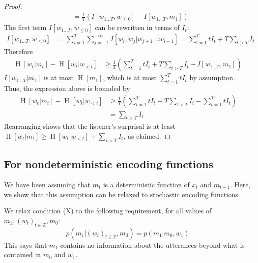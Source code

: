 \documentclass[11pt,letterpaper]{article}
\begin{document}
\begin{proof}
\begin{align}
& = \frac{1}{T} \left(I[w_{1\dots T}, w_{\leq 0}] - I[w_{1\dots T}, m_1]\right) 
\end{align}
The first term $I[w_{1\dots T}, w_{\leq 0}]$ can be rewritten in terms of $I_t$:
\begin{align}\label{eq:i-expanded}
I[w_{1\dots T}, w_{\leq 0}] &= \sum_{i=1}^T \sum_{j=-1}^{-\infty} I[w_i, w_j | w_{j+1}...w_{i-1}] = \sum_{t=1}^T t I_t + T \sum_{t > T} I_t
\end{align}
Therefore
\begin{align*}
\operatorname{H}[w_t | m_t] - \operatorname{H}[w_t | w_{<t}]& \geq \frac{1}{T} \left(\sum_{t=1}^T t I_t + T \sum_{t > T} I_t - I[w_{1\dots T}, m_1]\right) 
\end{align*}
$I[w_{1\dots T}|m_1]$ is at most $\operatorname{H}[m_1]$, which is at most $\sum_{t=1}^T t I_t$ by assumption. Thus, the expression above is bounded by
\begin{align*}
\operatorname{H}[w_t | m_t] - \operatorname{H}[w_t | w_{<t}]& \geq \frac{1}{T} \left(\sum_{t=1}^T t I_t + T \sum_{t > T} I_t - \sum_{t=1}^T t I_t\right) \\
&= \sum_{t > T} I_t
\end{align*}
Rearranging shows that the listener's surprisal is at least $\operatorname{H}[w_t|m_t] \geq \operatorname{H}[w_t | w_{<t}] + \sum_{t > T} I_t$, as claimed.
\end{proof}





\subsection{For nondeterministic encoding functions}

We have been assuming that $m_t$ is a deterministic function of $x_t$ and $m_{t-1}$.
Here, we show that this assumption can be relaxed to stochastic encoding functions.

We relax condition (X) to the following requirement, for all values of $m_1, (w_{t})_{t \in \mathbb{Z}}, m_0$:
\begin{equation}\label{eq:listener-markov-nondeterministic}
p(m_1| (w_{t})_{t \in \mathbb{Z}}, m_0)   = p(m_1 | m_0, w_1)
\end{equation}
This says that $m_1$ contains no information about the utterances beyond what is contained in $m_0$ and $w_1$.	
\end{document}
